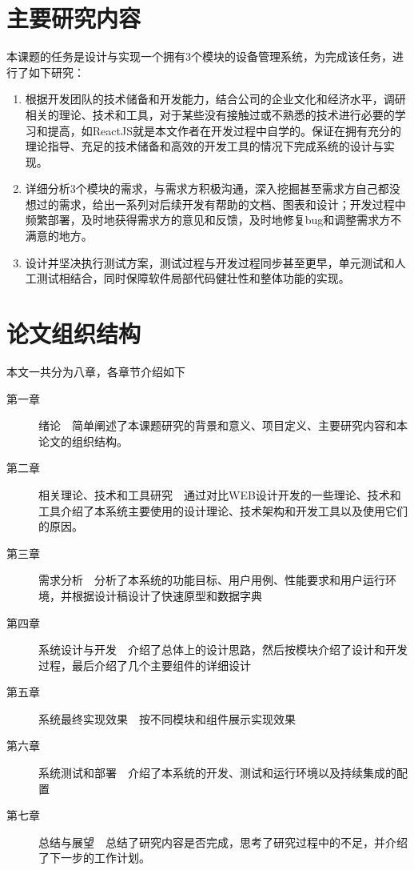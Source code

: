 \section{主要研究内容}
本课题的任务是设计与实现一个拥有3个模块的设备管理系统，为完成该任务，进行了如下研究：
\begin{enumerate}
  \item 根据开发团队的技术储备和开发能力，结合公司的企业文化和经济水平，调研相关的理论、技术和工具，对于某些没有接触过或不熟悉的技术进行必要的学习和提高，如ReactJS就是本文作者在开发过程中自学的。保证在拥有充分的理论指导、充足的技术储备和高效的开发工具的情况下完成系统的设计与实现。
  \item 详细分析3个模块的需求，与需求方积极沟通，深入挖掘甚至需求方自己都没想过的需求，给出一系列对后续开发有帮助的文档、图表和设计；开发过程中频繁部署，及时地获得需求方的意见和反馈，及时地修复bug和调整需求方不满意的地方。
  \item 设计并坚决执行测试方案，测试过程与开发过程同步甚至更早，单元测试和人工测试相结合，同时保障软件局部代码健壮性和整体功能的实现。
\end{enumerate}

\section{论文组织结构}
本文一共分为八章，各章节介绍如下
\begin{description}
    \item[第一章] 绪论~~简单阐述了本课题研究的背景和意义、项目定义、主要研究内容和本论文的组织结构。
    \item[第二章] 相关理论、技术和工具研究~~通过对比WEB设计开发的一些理论、技术和工具介绍了本系统主要使用的设计理论、技术架构和开发工具以及使用它们的原因。
    \item[第三章] 需求分析~~分析了本系统的功能目标、用户用例、性能要求和用户运行环境，并根据设计稿设计了快速原型和数据字典
    \item[第四章] 系统设计与开发~~介绍了总体上的设计思路，然后按模块介绍了设计和开发过程，最后介绍了几个主要组件的详细设计
    \item[第五章] 系统最终实现效果~~按不同模块和组件展示实现效果
    \item[第六章] 系统测试和部署~~介绍了本系统的开发、测试和运行环境以及持续集成的配置
    \item[第七章] 总结与展望~~总结了研究内容是否完成，思考了研究过程中的不足，并介绍了下一步的工作计划。
\end{description}
